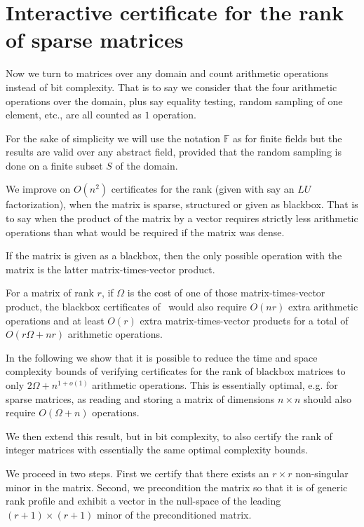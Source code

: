 \documentclass{article}
\newcommand{\customlinebreak}{}
\newcommand{\F}{\ensuremath{\mathbb F}}
\newcommand{\bigO}[1]{\ensuremath{O(#1)}\xspace}
\begin{document}
\section{Interactive certificate for{\customlinebreak} the rank of sparse matrices}\label{sec:sparserank}
 
Now we turn to matrices over any domain and count arithmetic
operations instead of bit complexity. That is to say we consider that the four
arithmetic operations over the domain, plus say equality testing, random
sampling of one element, etc., are all counted as $1$ operation.
 
For the sake of simplicity we will use the notation $\F$ as for finite fields
but the results are valid over any abstract field, provided that the random
sampling is done on a finite subset $S$ of the domain. 

We improve on $\bigO{n^2}$ certificates for the rank (given
with say an $LU$ factorization), when the matrix is sparse, structured or given
as blackbox. That is to say when the product of the matrix by a vector 
requires strictly less arithmetic operations than what would be required if the
matrix was dense. 
 
If the matrix is given as a blackbox, then the only possible operation with the
matrix is the latter matrix-times-vector product.
 
For a matrix of rank $r$, if $\Omega$ is the cost of one of those
matrix-times-vector product, the blackbox certificates
of~\cite{Saunders:2004:rankcert} would also require $\bigO{nr}$ extra arithmetic
operations and at least $\bigO{r}$ extra matrix-times-vector products for a
total of $\bigO{r\Omega+nr}$ arithmetic operations.

In the following we show that it is possible to reduce the time and space
complexity bounds of verifying certificates for the rank of blackbox matrices to
only $2\Omega+n^{1+o(1)}$ arithmetic operations. 
This is essentially optimal, e.g. for sparse matrices, as reading and
storing a matrix of dimensions $n\times n$ should also require
$\bigO{\Omega+n}$ operations. 
 
We then extend this result, but in bit complexity, to also certify the rank of
integer matrices with essentially the same optimal complexity bounds.

We proceed in two steps. First we certify that there exists an
$r\times r$ non-singular minor in the matrix. Second, we precondition the matrix
so that it is of generic rank profile and exhibit a vector in the null-space of
the leading $(r+1)\times(r+1)$ minor of the preconditioned matrix. 
 
\end{document}

